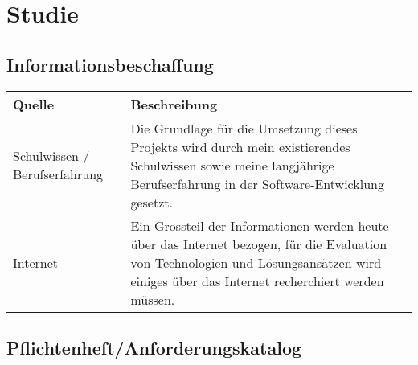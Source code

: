 \chapter{Studie}

\label{AppendixStudie}

\section{Informationsbeschaffung}\label{informationsbeschaffung}

\begin{longtable}[]{@{}lp{10cm}@{}}
  \toprule
  Quelle                        & Beschreibung\tabularnewline
  \toprule
  Schulwissen / Berufserfahrung & Die Grundlage für die Umsetzung dieses Projekts wird durch mein existierendes Schulwissen sowie meine langjährige Berufserfahrung in der Software-Entwicklung gesetzt.\tabularnewline
  \midrule
  Internet                      & Ein Grossteil der Informationen werden heute über das Internet bezogen, für die Evaluation von Technologien und Lösungsansätzen wird einiges über das Internet recherchiert werden müssen.\tabularnewline
  \bottomrule
\end{longtable}

\clearpage
\section{Pflichtenheft/Anforderungskatalog}\label{pflichtenheftanforderungskatalog}

